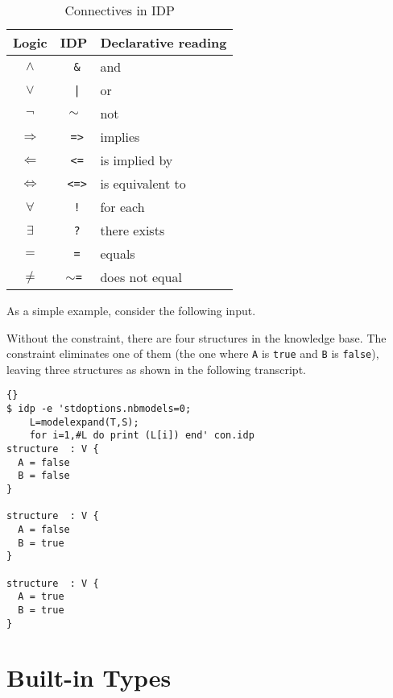 \documentclass{article}
\newcommand{\idp}{{\sc IDP}\xspace}
\newcommand{\code}[1]{\texttt{#1}}
\newcommand{\limplies}{\ensuremath{\Rightarrow}}
\newcommand{\limpliedby}{\ensuremath{\Leftarrow}}
\newcommand{\lequiv}{\ensuremath{\Leftrightarrow}}
\begin{document}
\begin{table}
\begin{center}
\begin{tabular}{c|c|l}
Logic & \idp & Declarative reading \\
\hline
$\land$    & \code{ \&}  & and \\
$\lor$    & \code{ |}  & or  \\
$\lnot$    & \code{$\sim$}  & not \\
$\limplies$    & \code{ =>}  & implies \\
$\limpliedby$    & \code{ <=}  & is implied by \\
$\lequiv$    & \code{ <=>}  & is equivalent to \\
$\forall$  & \code{ !}  & for each \\
$\exists$  & \code{ ?}  & there exists \\
$=$      & \code{ =}  & equals \\
$\neq$    & \code{$\sim$=}  & does not equal \\ 
\end{tabular}
\end{center}
\caption{Connectives in \idp}
\label{t:connectives}
\end{table}

As a simple example, consider the following input.

Without the constraint, there are four structures in the knowledge base.
The constraint eliminates one of them (the one where
\texttt{A} is \texttt{true} and \texttt{B} is \texttt{false}),
leaving three structures as shown in the following transcript.
\begin{lstlisting}{}
$ idp -e 'stdoptions.nbmodels=0;
    L=modelexpand(T,S);
    for i=1,#L do print (L[i]) end' con.idp 
structure  : V {
  A = false
  B = false
}

structure  : V {
  A = false
  B = true
}

structure  : V {
  A = true
  B = true
}

\end{lstlisting}

\section{Built-in Types}
\end{document}
